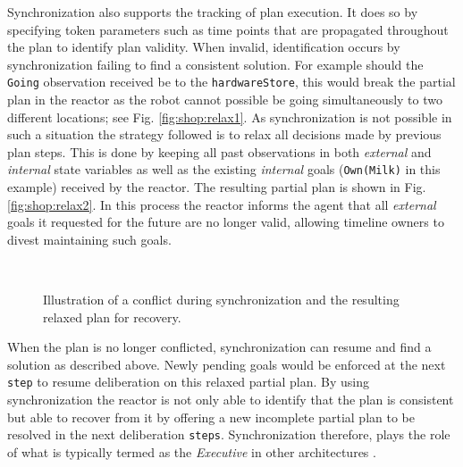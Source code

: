 Synchronization also supports the tracking of plan execution. It does
so by specifying token parameters such as time points that are
propagated throughout the plan to identify plan validity.
When invalid, identification occurs by synchronization failing to find
a consistent solution. For example should the \texttt{Going}
observation received be to the \texttt{hardwareStore}, this would
break the partial plan in the reactor as the robot cannot possible be
going simultaneously to two different locations; see Fig.
\ref{fig:shop:relax1}. As synchronization is not possible in such a
situation the strategy followed is to relax all decisions made by
previous plan steps. This is done by keeping all past observations in
both {\em external} and {\em internal} state variables as well as the
existing {\em internal} goals (\texttt{Own(Milk)} in this example)
received by the reactor. The resulting partial plan is shown in Fig.
\ref{fig:shop:relax2}. In this process the reactor informs the agent
that all {\em external} goals it requested for the future are no
longer valid, allowing timeline owners to divest maintaining such
goals.

\begin{figure}[!b]
  \centering
  \\
  \caption{\small Illustration of a conflict during synchronization
    and the resulting relaxed plan for recovery.}
\end{figure}

When the plan is no longer conflicted, synchronization can resume and
find a solution as described above. Newly pending goals would be
enforced at the next \texttt{step} to resume deliberation on this
relaxed partial plan. By using synchronization the reactor is not only
able to identify that the plan is consistent but able to recover from
it by offering a new incomplete partial plan to be resolved in the
next deliberation \texttt{steps}. %
Synchronization therefore, plays the role of what is typically termed
as the {\em Executive} in other architectures \cite{gat98,
  alami:1998p820, mus98, williams03, Nesnas:2003do}.

